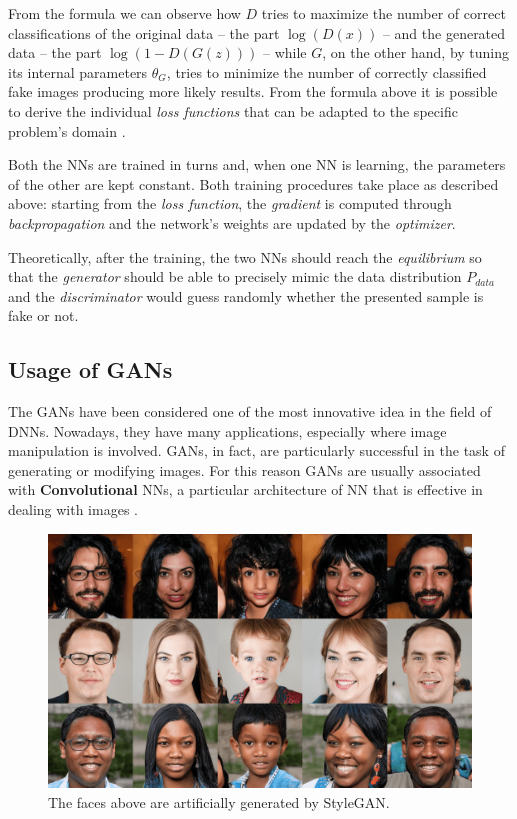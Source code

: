 From the formula we can observe how $D$ tries to maximize the number of correct classifications of the original data -- the part $\log(D(x))$ -- and the generated data -- the part $\log(1-D(G(z)))$ -- while $G$, on the other hand, by tuning its internal parameters $\theta_G$, tries to minimize the number of correctly classified fake images producing more likely results.
From the formula above it is possible to derive the individual \textit{loss functions} that can be adapted to the specific problem's domain \cite{gan_loss_survery}.

Both the NNs are trained in turns and, when one NN is learning, the parameters of the other are kept constant.
Both training procedures take place as described above: starting from the \textit{loss function}, the \textit{gradient} is computed through \textit{backpropagation} and the network's weights are updated by the \textit{optimizer}.

Theoretically, after the training, the two NNs should reach the \textit{equilibrium} so that the \textit{generator} should be able to precisely mimic the data distribution $P_{data}$ and the \textit{discriminator} would guess randomly whether the presented sample is fake or not.

\subsection{Usage of GANs}
The GANs have been considered one of the most innovative idea in the field of DNNs.
Nowadays, they have many applications, especially where image manipulation is involved.
GANs, in fact, are particularly successful in the task of generating or modifying images.
For this reason GANs are usually associated with \textbf{Convolutional} NNs, a particular architecture of NN that is effective in dealing with images \cite{dcgan}.

\begin{figure}[H]
	\centering
	\includegraphics[width=12cm, keepaspectratio]{img/2_2_stylegan_faces.png}
	\caption{The faces above are artificially generated by StyleGAN.}
\end{figure}


